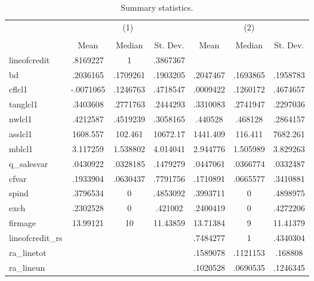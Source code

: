 \begin{table}[htbp]\centering
\def\sym#1{\ifmmode^{#1}\else\(^{#1}\)\fi}
\caption{Summary statistics.}
\begin{tabular}{l*{2}{ccc}}
\hline\hline
            &\multicolumn{3}{c}{(1)}               &\multicolumn{3}{c}{(2)}               \\
            &\multicolumn{3}{c}{}                  &\multicolumn{3}{c}{}                  \\
            &        Mean&      Median&    St. Dev.&        Mean&      Median&    St. Dev.\\
\hline
lineofcredit&    .8169227&           1&    .3867367&            &            &            \\
bd          &    .2036165&    .1709261&    .1903205&    .2047467&    .1693865&    .1958783\\
cflcl1      &   -.0071065&    .1246763&    .4718547&    .0009422&    .1260172&    .4674657\\
tanglcl1    &    .3403608&    .2771763&    .2444293&    .3310083&    .2741947&    .2297036\\
nwlcl1      &    .4212587&    .4519239&    .3058165&     .440528&     .468128&    .2864157\\
asslcl1     &    1608.557&     102.461&    10672.17&    1441.409&     116.411&    7682.261\\
mblcl1      &    3.117259&    1.538802&    4.014041&    2.944776&    1.505989&    3.829263\\
q\_salesvar  &    .0430922&    .0328185&    .1479279&    .0447061&    .0366774&    .0332487\\
cfvar       &    .1933904&    .0630437&    .7791756&    .1710891&    .0665577&    .3410881\\
spind       &    .3796534&           0&    .4853092&    .3993711&           0&    .4898975\\
exch        &    .2302528&           0&     .421002&    .2400419&           0&    .4272206\\
firmage     &    13.99121&          10&    11.43859&    13.71384&           9&    11.41379\\
lineofcredit\_rs&            &            &            &    .7484277&           1&    .4340304\\
ra\_linetot  &            &            &            &    .1589078&    .1121153&     .168808\\
ra\_lineun   &            &            &            &    .1020528&    .0690535&    .1246345\\

\end{tabular}
\end{table}
